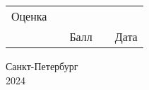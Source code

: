 \begin{titlepage}
    \vspace{1.5cm}
    \begin{tabular}{lcccc}
        \multirow{1}{2cm}{Оценка} & \hspace{3cm} & \underline{\hspace{3cm}} & \hspace{1cm} & \underline{\hspace{5cm}}\\
        \hspace{1cm} && \small{Балл} && \small{Дата} \\
    \end{tabular}

    \vspace{\fill}

    \begin{center}
    Санкт-Петербург\\ 2024
    \end{center}

    \end{titlepage}

